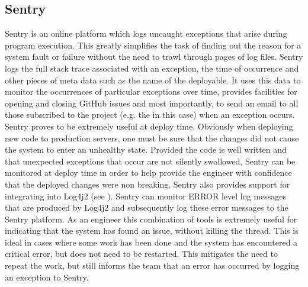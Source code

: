 \subsection{Sentry}
Sentry \cite{sentry} is an online platform which logs uncaught exceptions that arise during program execution. This greatly simplifies the task of finding out the reason for a system fault or failure without the need to trawl through pages of log files. Sentry logs the full stack trace associated with an exception, the time of occurrence and other pieces of meta data such as the name of the deployable. It uses this data to monitor the occurrences of particular exceptions over time, provides facilities for opening and closing GitHub issues and most importantly, to send an email to all those subscribed to the project (e.g. the \team{} in this case) when an exception occurs. Sentry proves to be extremely useful at deploy time. Obviously when deploying new code to production servers, one must be sure that the changes did not cause the system to enter an unhealthy state. Provided the code is well written and that unexpected exceptions that occur are not silently swallowed, Sentry can be monitored at deploy time in order to help provide the engineer with confidence that the deployed changes were non breaking. Sentry also provides support for integrating into Log4j2 (see ). Sentry can monitor ERROR level log messages that are produced by Log4j2 and subsequently log these error messages to the Sentry platform. As an engineer this combination of tools is extremely useful for indicating that the system has found an issue, without killing the thread. This is ideal in cases where some work has been done and the system has encountered a critical error, but does not need to be restarted. This mitigates the need to repeat the work, but still informs the team that an error has occurred by logging an exception to Sentry.


